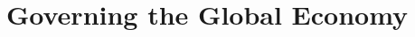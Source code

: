 \documentclass[../main]{subfiles}
\begin{document}
\section{Governing the Global Economy}
\end{document}
